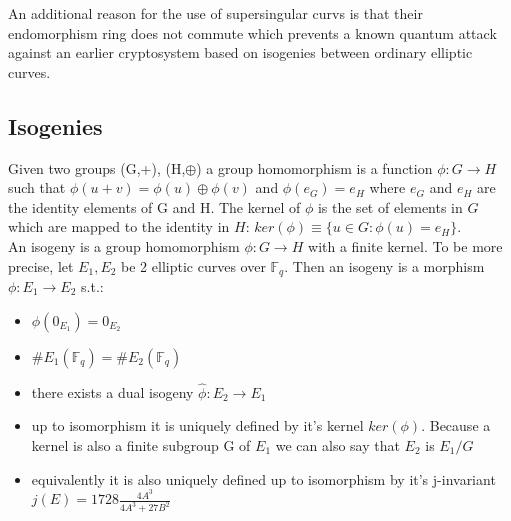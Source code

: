 An additional reason for the use of supersingular curvs is that their endomorphism ring does not commute which prevents a known quantum attack against an earlier cryptosystem based on isogenies between ordinary elliptic curves. 


\subsection{Isogenies}
Given two groups (G,+), (H,$\oplus$) a group homomorphism is a function $\phi: G \to H$ such that $\phi(u + v) = \phi(u) \oplus \phi(v)$ and $\phi(e_G) = e_H$ where $e_G$ and $e_H$ are the identity elements of G and H. The kernel of $\phi$ is the set of elements in $G$ which are mapped to the identity in $H$: $ker(\phi) \equiv \{u\in G:\phi(u)=e_H\}$.\\

An isogeny is a group homomorphism $\phi : G \to H$ with a finite kernel. To be more precise, let $E_1,E_2$ be 2 elliptic curves over $\mathbb{F}_q$. Then an isogeny is a morphism $\phi: E_1 \to E_2$ s.t.:
\begin{itemize}[\textbullet]
	\item $\phi(0_{E_1})= 0_{E_2}$
	\item $\#E_1(\mathbb{F}_q) = \#E_2(\mathbb{F}_q)$
	\item there exists a dual isogeny $\hat{\phi}: E_2 \to E_1$
	\item up to isomorphism it is uniquely defined by it's kernel $ker(\phi)$. Because a kernel is also a finite subgroup G of $E_1$ we can also say that $E_2$ is $E_1/G$
	\item equivalently it is also uniquely defined up to isomorphism by it's j-invariant $j(E)=1728\frac{4A^3}{4A^3+27B^2}$
\end{itemize}




